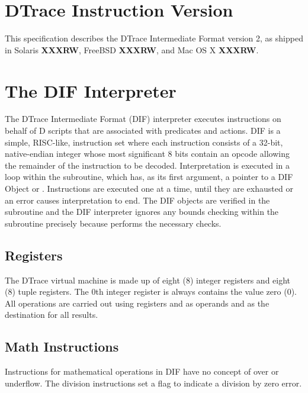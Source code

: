 
\section{DTrace Instruction Version}

This specification describes the DTrace Intermediate Format version 2, as
shipped in Solaris \textbf{XXXRW}, FreeBSD \textbf{XXXRW}, and Mac OS X
\textbf{XXXRW}.

\section{The DIF Interpreter}

The DTrace Intermediate Format (DIF) interpreter executes instructions
on behalf of D scripts that are associated with predicates and
actions.  DIF is a simple, RISC-like, instruction set where each
instruction consists of a 32-bit, native-endian integer whose most
significant 8 bits contain an opcode allowing the remainder of the
instruction to be decoded.  Interpretation is executed in a loop
within the  subroutine, which has, as
its first argument, a pointer to a DIF Object or
.  Instructions are executed one at a time,
until they are exhausted or an error causes interpretation to end. The DIF
objects are verified in the  subroutine and
the DIF interpreter ignores any bounds checking within the
 subroutine precisely because
 performs the necessary checks.

\subsection{Registers}
\label{sec:dif-registers}

The DTrace virtual machine is made up of eight (8) integer registers
and eight (8) tuple registers.  The 0th integer register is always contains
the value zero (0).  All operations are carried out using registers
 and  as operands and  as
the destination for all results.

\subsection{Math Instructions}
\label{sec:dif-math}

Instructions for mathematical operations in DIF have no concept of
over or underflow.  The division instructions set a flag to indicate a
division by zero error.

